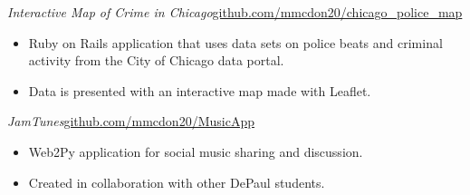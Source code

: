 \documentclass[margin]{res}
\begin{document}
\begin{resume}
                {\sl Interactive Map of Crime in Chicago}\hfill \href{http://github.com/mmcdon20/chicago\_police\_map}{github.com/mmcdon20/chicago\_police\_map}
                \begin{itemize} \itemsep -2pt
                  \item Ruby on Rails application that uses data sets on police beats and criminal activity from the City of Chicago data portal.
                  \item Data is presented with an interactive map made with Leaflet.
                \end{itemize}
                
                {\sl JamTunes}\hfill \href{http://github.com/mmcdon20/MusicApp}{github.com/mmcdon20/MusicApp}
                \begin{itemize} \itemsep -2pt
                  \item Web2Py application for social music sharing and discussion.
                  \item Created in collaboration with other DePaul students.
                \end{itemize}
                

\end{resume}
\end{document}
